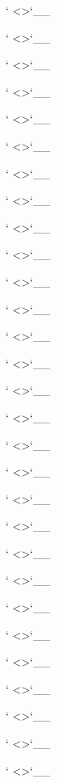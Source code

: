 \documentclass[letterpaper,12pt,english]{sphinxmanual}
\begin{document}
{}` \textless{}\textgreater{}{}`\_\_

{}` \textless{}\textgreater{}{}`\_\_

{}` \textless{}\textgreater{}{}`\_\_

{}` \textless{}\textgreater{}{}`\_\_

{}` \textless{}\textgreater{}{}`\_\_

{}` \textless{}\textgreater{}{}`\_\_

{}` \textless{}\textgreater{}{}`\_\_

{}` \textless{}\textgreater{}{}`\_\_

{}` \textless{}\textgreater{}{}`\_\_

{}` \textless{}\textgreater{}{}`\_\_

{}` \textless{}\textgreater{}{}`\_\_

{}` \textless{}\textgreater{}{}`\_\_

{}` \textless{}\textgreater{}{}`\_\_

{}` \textless{}\textgreater{}{}`\_\_

{}` \textless{}\textgreater{}{}`\_\_

{}` \textless{}\textgreater{}{}`\_\_

{}` \textless{}\textgreater{}{}`\_\_

{}` \textless{}\textgreater{}{}`\_\_

{}` \textless{}\textgreater{}{}`\_\_

{}` \textless{}\textgreater{}{}`\_\_

{}` \textless{}\textgreater{}{}`\_\_

{}` \textless{}\textgreater{}{}`\_\_

{}` \textless{}\textgreater{}{}`\_\_

{}` \textless{}\textgreater{}{}`\_\_

{}` \textless{}\textgreater{}{}`\_\_

{}` \textless{}\textgreater{}{}`\_\_

{}` \textless{}\textgreater{}{}`\_\_

{}` \textless{}\textgreater{}{}`\_\_

{}` \textless{}\textgreater{}{}`\_\_
\end{document}
